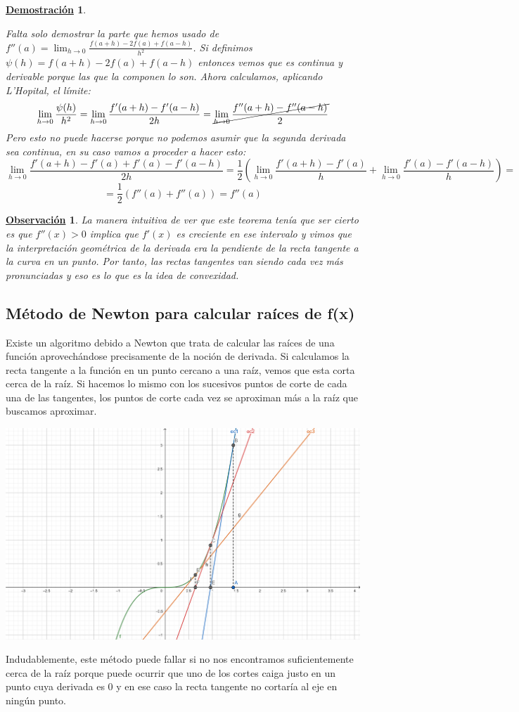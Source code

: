 \documentclass[10pt,a4paper,openright]{book}
\theoremstyle{break}
\newtheorem*{demo}{\underline{Demostración}}
\newtheorem{obs}{\underline{Observación}}[chapter]
\begin{document}
\begin{demo}
\begin{itemize}
Falta solo demostrar la parte que hemos usado de $f''(a)=\lim_{h\rightarrow 0 }\frac{f(a+h)-2f(a)+f(a-h)}{h^2}$. Si definimos $\psi(h) = f(a+h)-2f(a)+f(a-h)$ entonces vemos que es continua y derivable porque las que la componen lo son. Ahora calculamos, aplicando L'Hopital, el límite:
$$\lim_{h\rightarrow 0}\frac{\psi(h)}{h^2}=\lim_{h\rightarrow 0}\frac{f'(a+h)-f'(a-h)}{2h}= \cancel{\lim_{h\rightarrow 0}\frac{f''(a+h)-f''(a-h)}{2}}$$
Pero esto no puede hacerse porque no podemos asumir que la segunda derivada sea continua, en su caso vamos a proceder a hacer esto:
$$\lim_{h\rightarrow 0} \frac{f'(a+h)-f'(a)+f'(a)-f'(a-h)}{2h}= \frac{1}{2}\left(\lim_{h\rightarrow 0}\frac{f'(a+h)-f'(a)}{h}+ \lim_{h\rightarrow 0} \frac{f'(a)-f'(a-h)}{h}\right) = $$
$$=\frac{1}{2}\left(f''(a)+ f''(a)\right)=f''(a)$$
\end{itemize}
\end{demo}

\begin{obs}
La manera intuitiva de ver que este teorema tenía que ser cierto es que $f''(x)>0$ implica que $f'(x)$ es creciente en ese intervalo y vimos que la interpretación geométrica de la derivada era la pendiente de la recta tangente a la curva en un punto. Por tanto, las rectas tangentes van siendo cada vez más pronunciadas y eso es lo que es la idea de convexidad.
\end{obs}

\subsection{Método de Newton para calcular raíces de f(x)}
Existe un algoritmo debido a Newton que trata de calcular las raíces de una función aprovechándose precisamente de la noción de derivada. Si calculamos la recta tangente a la función en un punto cercano a una raíz, vemos que esta corta cerca de la raíz. Si hacemos lo mismo con los sucesivos puntos de corte de cada una de las tangentes, los puntos de corte cada vez se aproximan más a la raíz que buscamos aproximar.
\begin{center}
\includegraphics[scale=1.6]{metodo Newton}
\end{center}
Indudablemente, este método puede fallar si no nos encontramos suficientemente cerca de la raíz porque puede ocurrir que uno de los cortes caiga justo en un punto cuya derivada es 0 y en ese caso la recta tangente no cortaría al eje en ningún punto.
\end{document}
